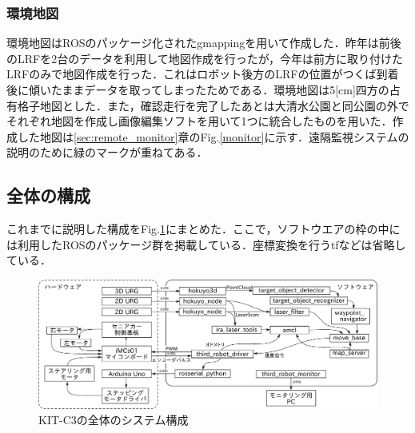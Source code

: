 \documentclass[10pt,a4paper]{jarticle}
\begin{document}
\subsubsection{環境地図}
環境地図はROSのパッケージ化されたgmappingを用いて作成した．昨年は前後のLRFを2台のデータを利用して地図作成を行ったが，今年は前方に取り付けたLRFのみで地図作成を行った．これはロボット後方のLRFの位置がつくば到着後に傾いたままデータを取ってしまったためである．環境地図は5[cm]四方の占有格子地図とした．また，確認走行を完了したあとは大清水公園と同公園の外でそれぞれ地図を作成し画像編集ソフトを用いて1つに統合したものを用いた．作成した地図は\ref{sec:remote_monitor}章のFig.\ref{monitor}に示す．遠隔監視システムの説明のために緑のマークが重ねてある．

\subsection{全体の構成}
これまでに説明した構成をFig.\ref{184559_7Dec16}にまとめた．ここで，ソフトウエアの枠の中には利用したROSのパッケージ群を掲載している．座標変換を行うtfなどは省略している．
\begin{figure}[ht]
 \centering
 \includegraphics[width=16cm]{./fig/eps/whole_system.eps}
 \caption{KIT-C3の全体のシステム構成}
 \label{184559_7Dec16}
\end{figure}
\end{document}
